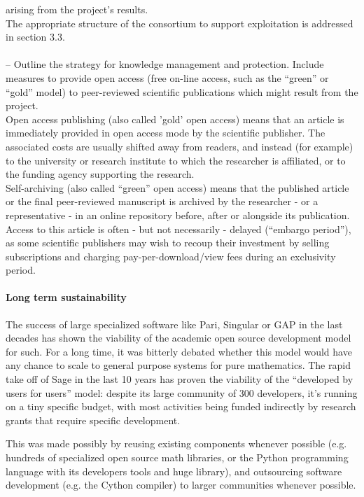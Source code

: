 \documentclass[a4paper,11pt]{article}
\begin{document}
{arising from the project's results.\\
The appropriate structure of the consortium to support exploitation is addressed
in section 3.3. \\ \\
-- Outline the strategy for knowledge management and protection. Include measures to
provide open access (free on-line access, such as the ``green'' or ``gold'' model) to
peer-reviewed scientific publications which might result from the project.\\
Open access publishing (also called 'gold' open access) means that an article is
immediately provided in open access mode by the scientific publisher. The associated costs
are usually shifted away from readers, and instead (for example) to the university or
research institute to which the researcher is affiliated, or to the funding agency supporting
the research.\\
Self-archiving (also called ``green'' open access) means that the published article or the
final peer-reviewed manuscript is archived by the researcher - or a representative - in an
online repository before, after or alongside its publication. Access to this article is often -
but not necessarily - delayed (``embargo period''), as some scientific publishers may wish to
recoup their investment by selling subscriptions and charging pay-per-download/view fees
during an exclusivity period.}


\paragraph{Long term sustainability}

The success of large specialized software like Pari, Singular or GAP
in the last decades has shown the viability of the academic open
source development model for such. For a long time, it was bitterly
debated whether this model would have any chance to scale to general
purpose systems for pure mathematics. The rapid take off of Sage in
the last 10 years has proven the viability of the ``developed by users
for users'' model: despite its large community of 300 developers, it's
running on a tiny specific budget, with most activities being funded
indirectly by research grants that require specific development.

This was made possibly by reusing existing components whenever
possible (e.g. hundreds of specialized open source math libraries, or
the Python programming language with its developers tools and huge
library), and outsourcing software development (e.g. the Cython
compiler) to larger communities whenever possible.
\end{document}
